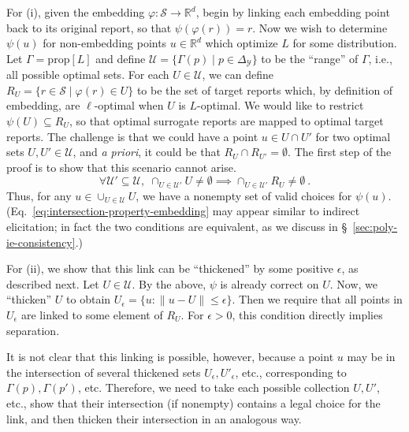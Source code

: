 \documentclass[twoside,11pt]{article}
\newcommand{\reals}{\mathbb{R}}
\newcommand{\prop}[1]{\mathrm{prop}[#1]}
\newcommand{\simplex}{\Delta_\Y}
\newcommand{\Sc}{\mathcal{S}}
\newcommand{\U}{\mathcal{U}}
\newcommand{\Y}{\mathcal{Y}}
\begin{document}
For (i), given the embedding $\varphi: \Sc\to\reals^d$, begin by linking each embedding point back to its original report, so that $\psi(\varphi(r)) = r$.
Now we wish to determine $\psi(u)$ for non-embedding points $u\in\reals^d$ which optimize $L$ for some distribution.
Let $\Gamma = \prop L$ and define $\U = \{\Gamma(p) \mid p\in\simplex\}$ to be the ``range'' of $\Gamma$, i.e., all possible optimal sets.
For each $U\in\U$, we can define $R_U = \{ r\in\Sc \mid \varphi(r) \in U\}$ to be the set of target reports which, by definition of embedding, are $\ell$-optimal when $U$ is $L$-optimal.
We would like to restrict $\psi(U) \subseteq R_U$, so that optimal surrogate reports are mapped to optimal target reports.
The challenge is that we could have a point $u\in U\cap U'$ for two optimal sets $U,U'\in\U$, and \emph{a priori}, it could be that $R_U \cap R_{U'} = \emptyset$.
The first step of the proof is to show that this scenario cannot arise.
\begin{equation}
  \label{eq:intersection-property-embedding}
  \forall \U'\subseteq\U, \; \cap_{U\in\U'} U \neq \emptyset \implies \cap_{U\in\U'} R_U \neq \emptyset~.
\end{equation}
\noindent
Thus, for any $u\in\cup_{U \in \U}U$, we have a nonempty set of valid choices for $\psi(u)$.
(Eq.~\eqref{eq:intersection-property-embedding} may appear similar to indirect elicitation; in fact the two conditions are equivalent, as we discuss in \S~\ref{sec:poly-ie-consistency}.)

For (ii), we show that this link can be ``thickened'' by some positive $\epsilon$, as described next.
Let $U\in\U$.
By the above, $\psi$ is already correct on $U$.
Now, we ``thicken'' $U$ to obtain $U_{\epsilon} = \{u : \|u - U\| \leq \epsilon\}$.
Then we require that all points in $U_{\epsilon}$ are linked to some element of $R_U$.
For $\epsilon > 0$, this condition directly implies separation.

It is not clear that this linking is possible, however, because a point $u$ may be in the intersection of several thickened sets $U_{\epsilon}, U'_{\epsilon}$, etc., corresponding to $\Gamma(p), \Gamma(p')$, etc.
Therefore, we need to take each possible collection $U,U'$, etc., show that their intersection (if nonempty) contains a legal choice for the link, and then thicken their intersection in an analogous way.
\end{document}
